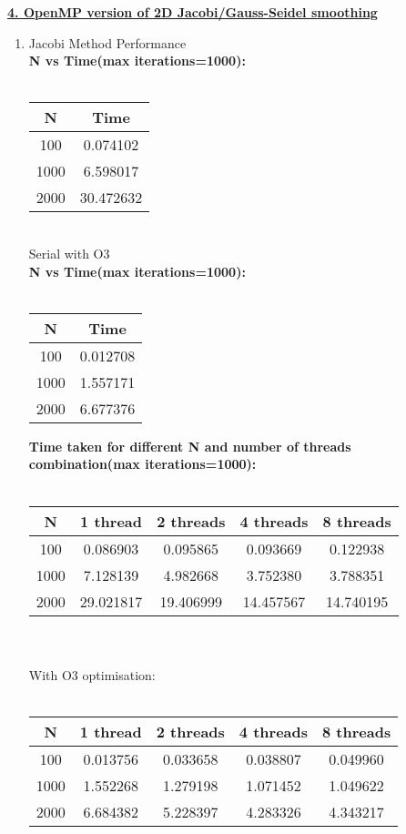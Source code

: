 \documentclass[12pt,letterpaper]{article}
\begin{document}
  
\underline{\textbf{4. OpenMP version of 2D Jacobi/Gauss-Seidel smoothing}} \\
\begin{enumerate}

    \item Jacobi Method Performance \\
  
    \textbf{N vs Time(max iterations=1000):} \\\\
    \begin{tabular}{ |c|c| } 
 \hline
  N & Time  \\ 
 \hline \hline 
  100    &  0.074102  \\
  1000 & 6.598017  \\
  2000 & 30.472632 \\ 
\hline 
\end{tabular}
\\
 Serial with O3\\
    \textbf{N vs Time(max iterations=1000):} \\\\
    \begin{tabular}{ |c|c| } 
 \hline
  N & Time  \\ 
 \hline \hline 
  100    &  0.012708  \\
  1000 & 1.557171  \\
  2000 & 6.677376 \\ 
\hline 
\end{tabular}
  
    
    \textbf{Time taken for different N and number of threads combination(max iterations=1000):} \\\\
\begin{tabular}{ |c|c|c|c|c| } 
 \hline
  N & 1 thread & 2 threads & 4 threads & 8 threads  \\ 
 \hline \hline 
  100 & 0.086903 & 0.095865   & 0.093669 &  0.122938 \\
  1000 & 7.128139 & 4.982668 & 3.752380 & 3.788351 \\
  2000 & 29.021817 & 19.406999 & 14.457567 & 14.740195 \\
 
\hline 
\end{tabular}
\\\\
With O3 optimisation: \\\
\begin{tabular}{ |c|c|c|c|c| } 
 \hline
  N & 1 thread & 2 threads & 4 threads & 8 threads  \\ 
 \hline \hline 
  100 & 0.013756 & 0.033658  &  0.038807 & 0.049960 \\
  1000 & 1.552268 & 1.279198 & 1.071452 & 1.049622 \\
  2000 & 6.684382 & 5.228397 & 4.283326 &  4.343217 \\
 

\end{tabular}
\end{enumerate}
\end{document}
